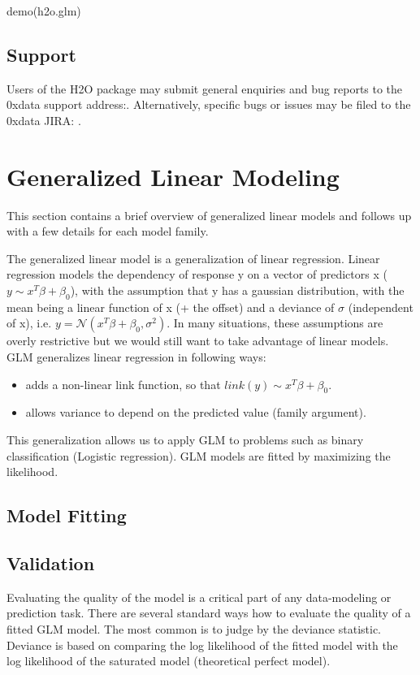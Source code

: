 \documentclass[11pt]{article}
\begin{document}
\begin{spverbatim}
demo(h2o.glm)
\end{spverbatim}

\subsection{Support} 

Users of the H2O package may submit general enquiries and bug reports to the 0xdata support address:. Alternatively, specific bugs or issues may be filed to the 0xdata JIRA: .

\section{Generalized Linear Modeling} 
This section contains a brief overview of generalized linear models and follows up with a few details for each model family.

The generalized linear model is a generalization of linear regression. Linear regression models the dependency of response y on a vector of predictors x ($y \sim x^T \beta + \beta_0$), with the assumption that y has a gaussian distribution, with the mean being a linear function of x (+ the offset) and a deviance of $\sigma$ (independent of x), i.e. $ y = \mathcal{N}(x^T \beta + \beta_0 , \sigma^2) $. In many situations, these assumptions are overly restrictive but we would still want to take advantage of linear models. GLM generalizes linear regression in following ways: 
\begin{itemize} 
\item adds a non-linear link function, so that $link(y) \sim x^T \beta + \beta_0$.
\item allows variance to depend on the predicted value (family argument).
\end{itemize}
This generalization allows us to apply GLM to problems such as binary classification (Logistic regression).
GLM models are fitted by maximizing the likelihood.

\subsection{Model Fitting}
\subsection{Validation}
Evaluating the quality of the model is a critical part of any data-modeling or prediction task. There are several standard ways how to evaluate the quality of a fitted GLM model. The most common is to judge by the deviance statistic. Deviance is based on comparing the log likelihood of the fitted model with the log likelihood of the saturated model (theoretical perfect model).
\end{document}
